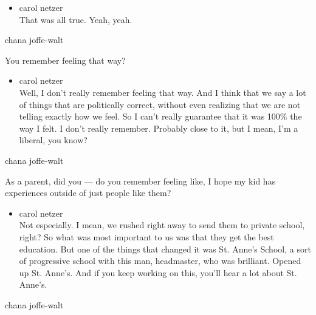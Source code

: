 \begin{itemize}
\tightlist
\item
  carol netzer\\
  That was all true. Yeah, yeah.
\end{itemize}

chana joffe-walt

You remember feeling that way?

\begin{itemize}
\tightlist
\item
  carol netzer\\
  Well, I don't really remember feeling that way. And I think that we
  say a lot of things that are politically correct, without even
  realizing that we are not telling exactly how we feel. So I can't
  really guarantee that it was 100\% the way I felt. I don't really
  remember. Probably close to it, but I mean, I'm a liberal, you know?
\end{itemize}

chana joffe-walt

As a parent, did you --- do you remember feeling like, I hope my kid has
experiences outside of just people like them?

\begin{itemize}
\tightlist
\item
  carol netzer\\
  Not especially. I mean, we rushed right away to send them to private
  school, right? So what was most important to us was that they get the
  best education. But one of the things that changed it was St. Anne's
  School, a sort of progressive school with this man, headmaster, who
  was brilliant. Opened up St. Anne's. And if you keep working on this,
  you'll hear a lot about St. Anne's.
\end{itemize}

chana joffe-walt

